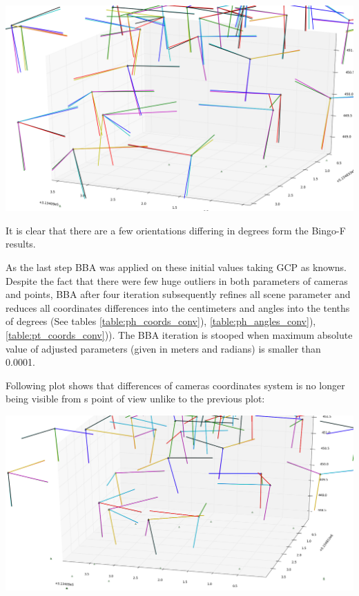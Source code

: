 \documentclass[a4paper,12pt]{article}
\begin{document}

\includegraphics[scale=0.3]{figures/angles_comaprison_relative_orinetaion.png}
 

It is clear that there are a few orientations differing in  degrees form the Bingo-F results. 

As the last step BBA was applied on these initial values taking GCP as knowns.
Despite the fact that there were few huge outliers in both parameters of cameras and points,
BBA after four iteration subsequently refines all scene parameter and reduces all coordinates 
differences into the centimeters and angles into the tenths of degrees (See tables \ref{table:ph_coords_conv}),
\ref{table:ph_angles_conv}), \ref{table:pt_coords_conv})). 
The BBA iteration is stooped when maximum absolute value of adjusted parameters (given in meters and radians) is
smaller than 0.0001.


Following plot shows that differences of cameras coordinates system is no longer being visible from s point of view
unlike to the previous plot:

\includegraphics[scale=0.3]{figures/result.png}
\end{document}
